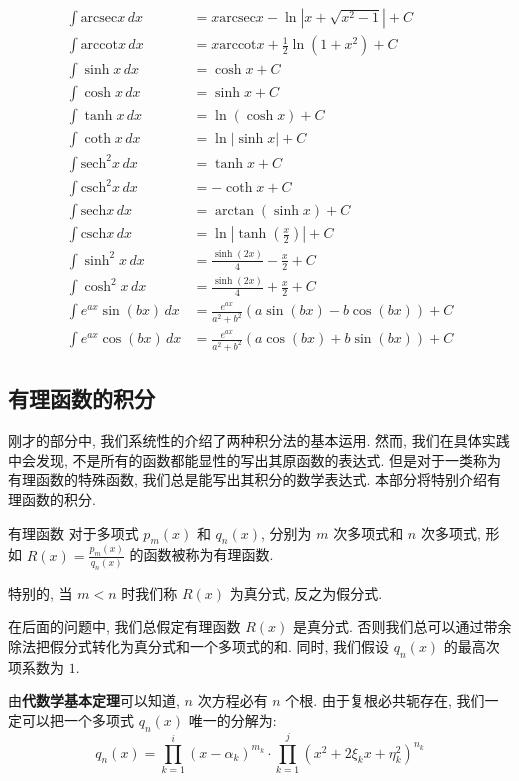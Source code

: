 \documentclass[a4paper,12pt]{ctexart}
\begin{document}
\begin{align*}
\int \text{arcsec} x \, dx &= x\text{arcsec} x - \ln|x + \sqrt{x^2 - 1}| + C \\
\int \text{arccot} x \, dx &= x\text{arccot} x + \frac{1}{2}\ln(1+x^2) + C \\
\int \sinh x \, dx &= \cosh x + C \\
\int \cosh x \, dx &= \sinh x + C \\
\int \tanh x \, dx &= \ln(\cosh x) + C \\
\int \coth x \, dx &= \ln|\sinh x| + C \\
\int \text{sech}^2 x \, dx &= \tanh x + C \\
\int \text{csch}^2 x \, dx &= -\coth x + C \\
\int \text{sech} x \, dx &= \arctan(\sinh x) + C \\
\int \text{csch} x \, dx &= \ln\left|\tanh\left(\frac{x}{2}\right)\right| + C \\
\int \sinh^2 x \, dx &= \frac{\sinh(2x)}{4} - \frac{x}{2} + C \\
\int \cosh^2 x \, dx &= \frac{\sinh(2x)}{4} + \frac{x}{2} + C \\
\int e^{ax} \sin(bx) \, dx &= \frac{e^{ax}}{a^2+b^2}(a\sin(bx) - b\cos(bx)) + C \\
\int e^{ax} \cos(bx) \, dx &= \frac{e^{ax}}{a^2+b^2}(a\cos(bx) + b\sin(bx)) + C
\end{align*}

\subsection{有理函数的积分}

刚才的部分中, 我们系统性的介绍了两种积分法的基本运用. 然而, 我们在具体实践中会发现, 不是所有的函数都能显性的写出其原函数的表达式. 但是对于一类称为有理函数的特殊函数, 我们总是能写出其积分的数学表达式. 本部分将特别介绍有理函数的积分.

\begin{mydef}{有理函数}{}
对于多项式 $p_m(x)$ 和 $q_n(x)$, 分别为 $m$ 次多项式和 $n$ 次多项式, 形如 $R(x) = \frac{p_m(x)}{q_n(x)}$ 的函数被称为有理函数.
\end{mydef}

特别的, 当 $m<n$ 时我们称 $R(x)$ 为真分式, 反之为假分式. 

在后面的问题中, 我们总假定有理函数 $R(x)$ 是真分式. 否则我们总可以通过带余除法把假分式转化为真分式和一个多项式的和. 同时, 我们假设 $q_n(x)$ 的最高次项系数为 $1$.

由\textbf{代数学基本定理}可以知道, $n$ 次方程必有 $n$ 个根. 由于复根必共轭存在, 我们一定可以把一个多项式 $q_n(x)$ 唯一的分解为:
$$
q_n(x) = \prod^{i}_{k=1} (x-\alpha_k)^{m_k} \cdot \prod^{j}_{k=1}(x^2 + 2\xi_kx+\eta_k^2)^{n_k}
$$
\end{document}
